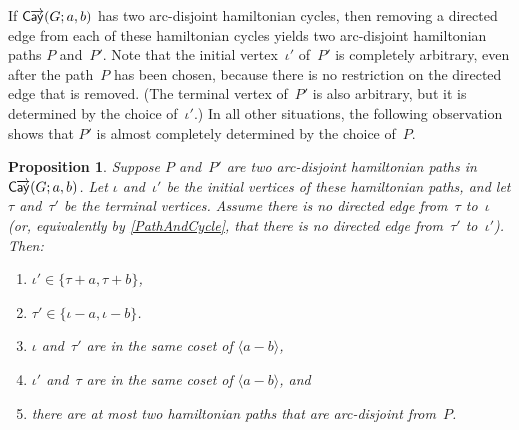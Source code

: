 \documentclass[11pt]{amsart}
\newtheorem{prop}[equation]{Proposition}
\theoremstyle{definition}
\numberwithin{case}{startcases}
\numberwithin{equation}{section}
\newcommand{\cayd}{\mathop{\mathsf{C}\mkern-1mu\overrightarrow{\mathsf{ay}}}}
\begin{document}
	If $\cayd(G; a,b)$ has two arc-disjoint hamiltonian cycles, then removing a directed edge from each of these hamiltonian cycles yields two arc-disjoint hamiltonian paths $P$ and~$P'$. Note that the initial vertex~$\iota'$ of~$P'$ is completely arbitrary, even after the path~$P$ has been chosen, because there is no restriction on the directed edge that is removed. (The terminal vertex of~$P'$ is also arbitrary, but it is determined by the choice of~$\iota'$.) In all other situations, the following observation shows that $P'$ is almost completely determined by the choice of~$P$.
	
	\begin{prop} \label{iota=tau}
		Suppose $P$ and~$P'$ are two arc-disjoint hamiltonian paths in $\cayd(G; a,b)$. Let $\iota$ and~$\iota'$ be the initial vertices of these hamiltonian paths, and let $\tau$ and~$\tau'$ be the terminal vertices. Assume there is no directed edge from~$\tau$ to~$\iota$ \textup(or, equivalently by \cref{PathAndCycle}, that there is no directed edge from~$\tau'$ to~$\iota'$\textup). Then:
		\begin{enumerate}
			\item \label{iota=tau-iota}
			$\iota' \in \{\tau + a, \tau + b\}$,
			\item \label{iota=tau-tau}
			$\tau' \in \{\iota - a, \iota - b\}$.
			\item \label{iota=tau-same}
			$\iota$ and~$\tau'$ are in the same coset of $\langle a - b \rangle$,
			\item \label{iota=tau-same'}
			$\iota'$ and~$\tau$ are in the same coset of $\langle a - b \rangle$,
			and
			\item \label{iota=tau-unique}
			there are at most two hamiltonian paths that are arc-disjoint from~$P$.
		\end{enumerate}
	\end{prop}
	
\end{document}
